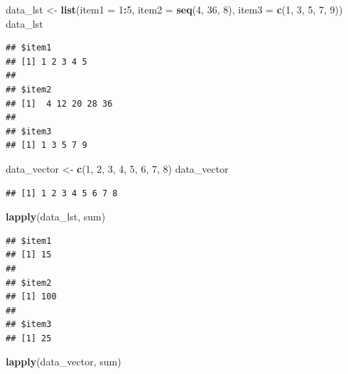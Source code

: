 \documentclass[
]{book}
\newenvironment{Shaded}{\begin{snugshade}}{\end{snugshade}}
\newcommand{\DataTypeTok}[1]{\textcolor[rgb]{0.13,0.29,0.53}{#1}}
\newcommand{\DecValTok}[1]{\textcolor[rgb]{0.00,0.00,0.81}{#1}}
\newcommand{\KeywordTok}[1]{\textcolor[rgb]{0.13,0.29,0.53}{\textbf{#1}}}
\newcommand{\NormalTok}[1]{#1}
\newcommand{\OperatorTok}[1]{\textcolor[rgb]{0.81,0.36,0.00}{\textbf{#1}}}
\newcommand{\StringTok}[1]{\textcolor[rgb]{0.31,0.60,0.02}{#1}}
\begin{document}
\begin{Shaded}
\begin{Highlighting}[]
\NormalTok{data_lst <-}\StringTok{ }\KeywordTok{list}\NormalTok{(}\DataTypeTok{item1 =} \DecValTok{1}\OperatorTok{:}\DecValTok{5}\NormalTok{,}
    \DataTypeTok{item2 =} \KeywordTok{seq}\NormalTok{(}\DecValTok{4}\NormalTok{, }\DecValTok{36}\NormalTok{,}
        \DecValTok{8}\NormalTok{), }\DataTypeTok{item3 =} \KeywordTok{c}\NormalTok{(}\DecValTok{1}\NormalTok{,}
        \DecValTok{3}\NormalTok{, }\DecValTok{5}\NormalTok{, }\DecValTok{7}\NormalTok{, }\DecValTok{9}\NormalTok{))}
\NormalTok{data_lst}
\end{Highlighting}
\end{Shaded}

\begin{verbatim}
## $item1
## [1] 1 2 3 4 5
## 
## $item2
## [1]  4 12 20 28 36
## 
## $item3
## [1] 1 3 5 7 9
\end{verbatim}

\begin{Shaded}
\begin{Highlighting}[]
\NormalTok{data_vector <-}\StringTok{ }\KeywordTok{c}\NormalTok{(}\DecValTok{1}\NormalTok{, }\DecValTok{2}\NormalTok{,}
    \DecValTok{3}\NormalTok{, }\DecValTok{4}\NormalTok{, }\DecValTok{5}\NormalTok{, }\DecValTok{6}\NormalTok{, }\DecValTok{7}\NormalTok{, }\DecValTok{8}\NormalTok{)}
\NormalTok{data_vector}
\end{Highlighting}
\end{Shaded}

\begin{verbatim}
## [1] 1 2 3 4 5 6 7 8
\end{verbatim}

\begin{Shaded}
\begin{Highlighting}[]
\KeywordTok{lapply}\NormalTok{(data_lst, sum)}
\end{Highlighting}
\end{Shaded}

\begin{verbatim}
## $item1
## [1] 15
## 
## $item2
## [1] 100
## 
## $item3
## [1] 25
\end{verbatim}

\begin{Shaded}
\begin{Highlighting}[]
\KeywordTok{lapply}\NormalTok{(data_vector, sum)}
\end{Highlighting}
\end{Shaded}
\end{document}
